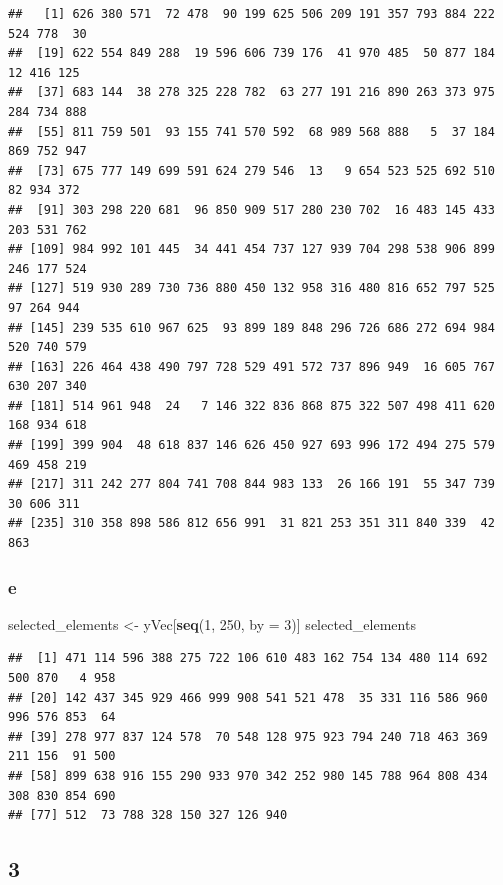 \documentclass[
]{article}
\newenvironment{Shaded}{\begin{snugshade}}{\end{snugshade}}
\newcommand{\AttributeTok}[1]{\textcolor[rgb]{0.13,0.29,0.53}{#1}}
\newcommand{\DecValTok}[1]{\textcolor[rgb]{0.00,0.00,0.81}{#1}}
\newcommand{\FunctionTok}[1]{\textcolor[rgb]{0.13,0.29,0.53}{\textbf{#1}}}
\newcommand{\NormalTok}[1]{#1}
\newcommand{\OtherTok}[1]{\textcolor[rgb]{0.56,0.35,0.01}{#1}}
\begin{document}
\begin{verbatim}
##   [1] 626 380 571  72 478  90 199 625 506 209 191 357 793 884 222 524 778  30
##  [19] 622 554 849 288  19 596 606 739 176  41 970 485  50 877 184  12 416 125
##  [37] 683 144  38 278 325 228 782  63 277 191 216 890 263 373 975 284 734 888
##  [55] 811 759 501  93 155 741 570 592  68 989 568 888   5  37 184 869 752 947
##  [73] 675 777 149 699 591 624 279 546  13   9 654 523 525 692 510  82 934 372
##  [91] 303 298 220 681  96 850 909 517 280 230 702  16 483 145 433 203 531 762
## [109] 984 992 101 445  34 441 454 737 127 939 704 298 538 906 899 246 177 524
## [127] 519 930 289 730 736 880 450 132 958 316 480 816 652 797 525  97 264 944
## [145] 239 535 610 967 625  93 899 189 848 296 726 686 272 694 984 520 740 579
## [163] 226 464 438 490 797 728 529 491 572 737 896 949  16 605 767 630 207 340
## [181] 514 961 948  24   7 146 322 836 868 875 322 507 498 411 620 168 934 618
## [199] 399 904  48 618 837 146 626 450 927 693 996 172 494 275 579 469 458 219
## [217] 311 242 277 804 741 708 844 983 133  26 166 191  55 347 739  30 606 311
## [235] 310 358 898 586 812 656 991  31 821 253 351 311 840 339  42 863
\end{verbatim}

\subsubsection{e}\label{e}

\begin{Shaded}
\begin{Highlighting}[]
\NormalTok{selected\_elements }\OtherTok{\textless{}{-}}\NormalTok{ yVec[}\FunctionTok{seq}\NormalTok{(}\DecValTok{1}\NormalTok{, }\DecValTok{250}\NormalTok{, }\AttributeTok{by =} \DecValTok{3}\NormalTok{)]}
\NormalTok{selected\_elements}
\end{Highlighting}
\end{Shaded}

\begin{verbatim}
##  [1] 471 114 596 388 275 722 106 610 483 162 754 134 480 114 692 500 870   4 958
## [20] 142 437 345 929 466 999 908 541 521 478  35 331 116 586 960 996 576 853  64
## [39] 278 977 837 124 578  70 548 128 975 923 794 240 718 463 369 211 156  91 500
## [58] 899 638 916 155 290 933 970 342 252 980 145 788 964 808 434 308 830 854 690
## [77] 512  73 788 328 150 327 126 940
\end{verbatim}

\subsection{3}\label{section-2}
\end{document}

